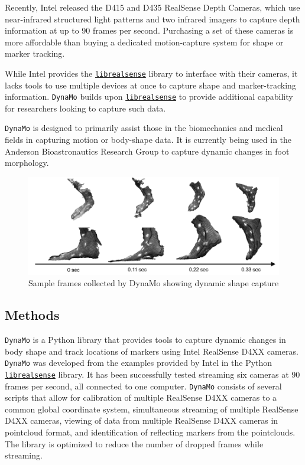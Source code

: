 \documentclass[defaultstyle,11pt]{comps}
\begin{document}
Recently, Intel released the D415 and D435 RealSense Depth Cameras, which use near-infrared structured light patterns and two infrared imagers to capture depth information at up to 90 frames per second.
Purchasing a set of these cameras is more affordable than buying a dedicated motion-capture system for shape or marker tracking.

While Intel provides the \href{https://github.com/IntelRealSense/librealsense}{\texttt{librealsense}} library to interface with their cameras, it lacks tools to use multiple devices at once to capture shape and marker-tracking information.
\texttt{DynaMo} builds upon \href{https://github.com/IntelRealSense/librealsense}{\texttt{librealsense}} to provide additional capability for researchers looking to capture such data.

\texttt{DynaMo} is designed to primarily assist those in the biomechanics and medical fields in capturing motion or body-shape data.
It is currently being used in the Anderson Bioastronautics Research Group to capture dynamic changes in foot morphology.

\begin{figure}
\centering
\includegraphics{../fig/SA2/sampleFrames.png}
\caption{Sample frames collected by DynaMo showing dynamic shape capture}
\end{figure}

\hypertarget{methods-1}{%
\subsection{Methods}\label{methods-1}}

\texttt{DynaMo} is a Python library that provides tools to capture dynamic changes in body shape and track locations of markers using Intel RealSense D4XX cameras.
\texttt{DynaMo} was developed from the examples provided by Intel in the Python \href{https://github.com/IntelRealSense/librealsense}{\texttt{librealsense}} library. It has been successfully tested streaming six cameras at 90 frames per second, all connected to one computer.
\texttt{DynaMo} consists of several scripts that allow for calibration of multiple RealSense D4XX cameras to a common global coordinate system, simultaneous streaming of multiple RealSense D4XX cameras, viewing of data from multiple RealSense D4XX cameras in pointcloud format, and identification of reflecting markers from the pointclouds.
The library is optimized to reduce the number of dropped frames while streaming.
\end{document}
